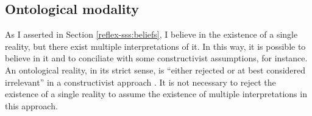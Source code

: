 
        


        

\subsection{Ontological modality}

As I asserted in Section \ref{reflex-sss:beliefs}, I believe in the existence of a single reality, but there exist multiple interpretations of it. In this way, it is possible to believe in it and to conciliate with some constructivist assumptions, for instance. An ontological reality, in its strict sense, is “either rejected or at best considered irrelevant” in a constructivist approach \cite[p.~50]{ben-ari:2001}. It is not necessary to reject the existence of a single reality to assume the existence of multiple interpretations in this approach. 

